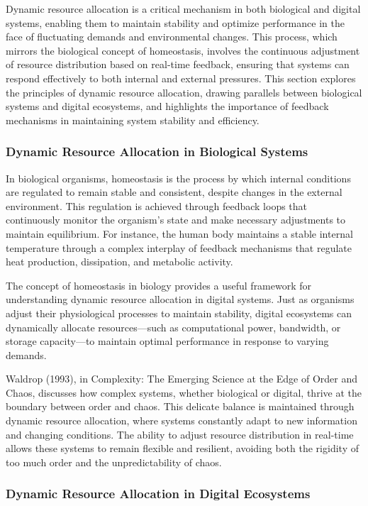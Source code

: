 \documentclass[12pt,twoside]{article}
\begin{document}
Dynamic resource allocation is a critical mechanism in both biological and digital systems, enabling them to maintain stability and optimize performance in the face of fluctuating demands and environmental changes. This process, which mirrors the biological concept of homeostasis, involves the continuous adjustment of resource distribution based on real-time feedback, ensuring that systems can respond effectively to both internal and external pressures. This section explores the principles of dynamic resource allocation, drawing parallels between biological systems and digital ecosystems, and highlights the importance of feedback mechanisms in maintaining system stability and efficiency.

\subsubsection{Dynamic Resource Allocation in Biological Systems}

In biological organisms, homeostasis is the process by which internal conditions are regulated to remain stable and consistent, despite changes in the external environment. This regulation is achieved through feedback loops that continuously monitor the organism’s state and make necessary adjustments to maintain equilibrium. For instance, the human body maintains a stable internal temperature through a complex interplay of feedback mechanisms that regulate heat production, dissipation, and metabolic activity.

The concept of homeostasis in biology provides a useful framework for understanding dynamic resource allocation in digital systems. Just as organisms adjust their physiological processes to maintain stability, digital ecosystems can dynamically allocate resources—such as computational power, bandwidth, or storage capacity—to maintain optimal performance in response to varying demands.

Waldrop (1993), in Complexity: The Emerging Science at the Edge of Order and Chaos, discusses how complex systems, whether biological or digital, thrive at the boundary between order and chaos. This delicate balance is maintained through dynamic resource allocation, where systems constantly adapt to new information and changing conditions. The ability to adjust resource distribution in real-time allows these systems to remain flexible and resilient, avoiding both the rigidity of too much order and the unpredictability of chaos.

\subsubsection{Dynamic Resource Allocation in Digital Ecosystems}
\end{document}
